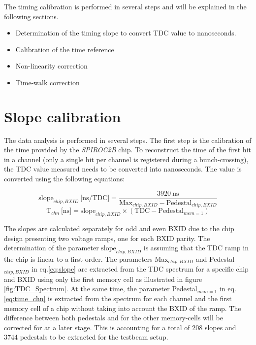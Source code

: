 The timing calibration is performed in several steps and will be explained in the following sections.
\begin{itemize}
	\item Determination of the timing slope to convert TDC value to nanoseconds.
	\item Calibration of the time reference
	\item Non-linearity correction
	\item Time-walk correction
\end{itemize}

\section{Slope calibration}
\label{subsec:slope_calib}

The data analysis is performed in several steps. The first step is the calibration of the time provided by the \textit{SPIROC2B} chip. To reconstruct the time of the first hit in a channel (only a single hit per channel is registered during a bunch-crossing), the TDC value measured needs to be converted into nanoseconds. The value is converted using the following equations:

\begin{equation} \label{eq:slope}
	\text{slope}_{chip, BXID} \: \text{[ns/TDC]} = \frac{3920 \: \text{ns}}{\text{Max}_{chip, BXID} - \text{Pedestal}_{chip, BXID}}
\end{equation}
\begin{equation} \label{eq:time_chn}
	\text{T}_{chn} \: \text{[ns]} = \text{slope}_{chip, BXID} \times (\text{TDC} - \text{Pedestal}_{mem=1} )
\end{equation}

The slopes are calculated separately for odd and even BXID due to the chip design presenting two voltage ramps, one for each BXID parity. The determination of the parameter $\text{slope}_{chip, BXID}$ is assuming that the TDC ramp in the chip is linear to a first order. The parameters Max$_{chip, BXID}$ and Pedestal$_{chip, BXID}$ in eq.\ref{eq:slope} are extracted from the TDC spectrum for a specific chip and BXID using only the first memory cell as illustrated in figure \ref{fig:TDC_Spectrum}. At the same time, the parameter Pedestal$_{mem=1}$ in eq.\ref{eq:time_chn} is extracted from the spectrum for each channel and the first memory cell of a chip without taking into account the BXID of the ramp. The difference between both pedestals and for the other memory-cells will be corrected for at a later stage. This is accounting for a total of 208 slopes and 3744 pedestals to be extracted for the testbeam setup.

